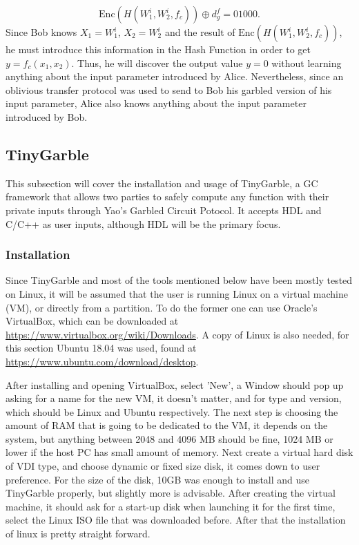 \begin{refsection}
\begin{equation}\label{eq:decryptiongarbled}
  \textrm{Enc}(H(W_1^i,W_2^i,f_c ))\oplus d_g^f = 0 1 0 0 0.
\end{equation}
Since Bob knows $X_1 = W_1^i$, $X_2=W_2^i$ and the result of $\textrm{Enc}(H(W_1^i,W_2^i,f_c ))$, he must introduce this information in the Hash Function in order to get $y=f_c(x_1,x_2)$. Thus, he will discover the output value $y=0$ without learning anything about the input parameter introduced by Alice. Nevertheless, since an oblivious transfer protocol was used to send to Bob his garbled version of his input parameter, Alice also knows anything about the input parameter introduced by Bob.

\newpage

\subsection{TinyGarble}

This subsection will cover the installation and usage of TinyGarble, a GC framework that allows two parties to safely compute any function with their private inputs through Yao's Garbled Circuit Potocol. It accepts HDL and C/C++ as user inputs, although HDL will be the primary focus.

\subsubsection{Installation}

Since TinyGarble and most of the tools mentioned below have been mostly tested on Linux, it will be assumed that the user is running Linux on a virtual machine (VM), or directly from a partition. To do the former one can use Oracle's VirtualBox, which can be downloaded at \url{https://www.virtualbox.org/wiki/Downloads}. A copy of Linux is also needed, for this section Ubuntu 18.04 was used, found at \url{https://www.ubuntu.com/download/desktop}.

After installing and opening VirtualBox, select 'New', a Window should pop up asking for a name for the new VM, it doesn't matter, and for type and version, which should be Linux and Ubuntu respectively. The next step is choosing the amount of RAM that is going to be dedicated to the VM,  it depends on the system, but anything between 2048 and 4096 MB should be fine, 1024 MB or lower if the host PC has small amount of memory. Next create a virtual hard disk of VDI type, and choose dynamic or fixed size disk, it comes down to user preference. For the size of the disk, 10GB was enough to install and use TinyGarble properly, but slightly more is advisable.
After creating the virtual machine, it should ask for a start-up disk when launching it for the first time, select the Linux ISO file that was downloaded before. After that the installation of linux is pretty straight forward.


\end{refsection}
